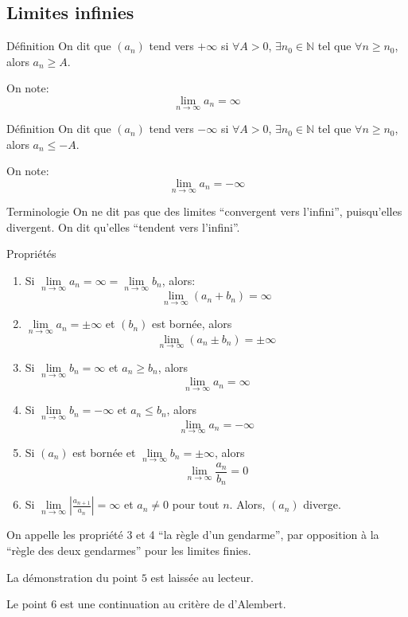 \documentclass[a4paper]{article}
\begin{document}
\subsection{Limites infinies}
\begin{parag}{Définition}
    On dit que $\left(a_n\right)$ tend vers $+\infty$ si $\forall A > 0$, $\exists n_0 \in \mathbb{N}$ tel que $\forall n \geq n_0$, alors $a_n \geq A$.

    On note: 
    \[\lim_{n \to \infty} a_n = \infty\]
\end{parag}

\begin{parag}{Définition}
    On dit que $\left(a_n\right)$ tend vers $-\infty$ si $\forall A > 0$, $\exists n_0 \in \mathbb{N}$ tel que $\forall n \geq n_0$, alors $a_n \leq -A$.

    On note: 
    \[\lim_{n \to \infty} a_n = -\infty\]
\end{parag}

\begin{parag}{Terminologie}
   On ne dit pas que des limites ``convergent vers l'infini'', puisqu'elles divergent. On dit qu'elles ``tendent vers l'infini''.
\end{parag}

\begin{parag}{Propriétés}
    \begin{enumerate}[left=0pt]
        \item Si $\lim\limits_{n \to \infty} a_n = \infty = \lim\limits_{n \to \infty} b_n$, alors:
        \[\lim\limits_{n \to \infty} \left(a_n + b_n\right) = \infty\]

        \item $\lim\limits_{n \to \infty} a_n = \pm \infty$ et $\left(b_n\right)$ est bornée, alors 
        \[\lim_{n \to \infty} \left(a_n \pm b_n\right) = \pm \infty\]
        \item Si $\lim\limits_{n \to \infty} b_n = \infty$ et $a_n \geq b_n$, alors 
        \[\lim_{n \to \infty} a_n = \infty\]
        
        \item Si $\lim\limits_{n \to \infty} b_n = -\infty$ et $a_n \leq b_n$, alors 
        \[\lim_{n \to \infty} a_n = -\infty\]
        
        \item Si $\left(a_n\right)$ est bornée et $\lim\limits_{n \to \infty} b_n = \pm \infty$, alors 
        \[\lim_{n \to \infty} \frac{a_n}{b_n} = 0\]
    
        \item Si $\lim\limits_{n \to \infty} \left|\frac{a_{n+1}}{a_n}\right| = \infty$ et $a_n \neq 0$ pour tout $n$. Alors, $\left(a_n\right)$ diverge.
    \end{enumerate}
    
    On appelle les propriété 3 et 4 ``la règle d'un gendarme'', par opposition à la ``règle des deux gendarmes'' pour les limites finies.

    La démonstration du point $5$ est laissée au lecteur.

    Le point 6 est une continuation au critère de d'Alembert.
\end{parag}
\end{document}
